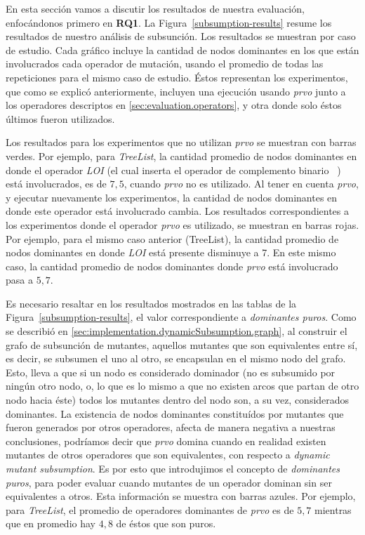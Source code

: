 En esta secci\'on vamos a discutir los resultados de nuestra evaluaci\'on, enfoc\'andonos primero en \textbf{RQ1}. La Figura~\ref{subsumption-results} resume los resultados de nuestro an\'alisis de subsunci\'on. Los resultados se muestran por caso de estudio. Cada gr\'afico incluye la cantidad de nodos dominantes en los que est\'an involucrados cada operador de mutaci\'on, usando el promedio de todas las repeticiones para el mismo caso de estudio. \'Estos representan los experimentos, que como se explic\'o anteriormente, incluyen una ejecuci\'on usando \emph{prvo} junto a los operadores descriptos en \ref{sec:evaluation.operators}, y otra donde solo \'estos \'ultimos fueron utilizados.

Los resultados para los experimentos que no utilizan \emph{prvo} se muestran con barras verdes. Por ejemplo, para \emph{TreeList}, la cantidad promedio de nodos dominantes en donde el operador \emph{LOI} (el cual inserta el operador de complemento binario \emph{~}) est\'a involucrados, es de $7,5$, cuando \emph{prvo} no es utilizado. Al tener en cuenta \emph{prvo}, y ejecutar nuevamente los experimentos, la cantidad de nodos dominantes en donde este operador est\'a involucrado cambia. Los resultados correspondientes a los experimentos donde el operador \emph{prvo} es utilizado, se muestran en barras rojas. Por ejemplo, para el mismo caso anterior (TreeList), la cantidad promedio de nodos dominantes en donde \emph{LOI} est\'a presente disminuye a 7. En este mismo caso, la cantidad promedio de nodos dominantes donde \emph{prvo} est\'a involucrado pasa a $5,7$.

Es necesario resaltar en los resultados mostrados en las tablas de la Figura~\ref{subsumption-results}, el valor correspondiente a \emph{dominantes puros}. Como se describi\'o en \ref{sec:implementation.dynamicSubsumption.graph}, al construir el grafo de subsunci\'on de mutantes, aquellos mutantes que son equivalentes entre s\'i, es decir, se subsumen el uno al otro, se encapsulan en el mismo nodo del grafo. Esto, lleva a que si un nodo es considerado dominador (no es subsumido por ning\'un otro nodo, o, lo que es lo mismo a que no existen arcos que partan de otro nodo hacia \'este) todos los mutantes dentro del nodo son, a su vez, considerados dominantes. La existencia de nodos dominantes constitu\'idos por mutantes que fueron generados por otros operadores, afecta de manera negativa a nuestras conclusiones, podr\'iamos decir que \emph{prvo} domina cuando en realidad existen mutantes de otros operadores que son equivalentes, con respecto a \emph{dynamic mutant subsumption}. Es por esto que introdujimos el concepto de \emph{dominantes puros}, para poder evaluar cuando mutantes de un operador dominan sin ser equivalentes a otros. Esta informaci\'on se muestra con barras azules. Por ejemplo, para \emph{TreeList}, el promedio de operadores dominantes de \emph{prvo} es de $5,7$ mientras que en promedio hay $4,8$ de \'estos que son puros.

